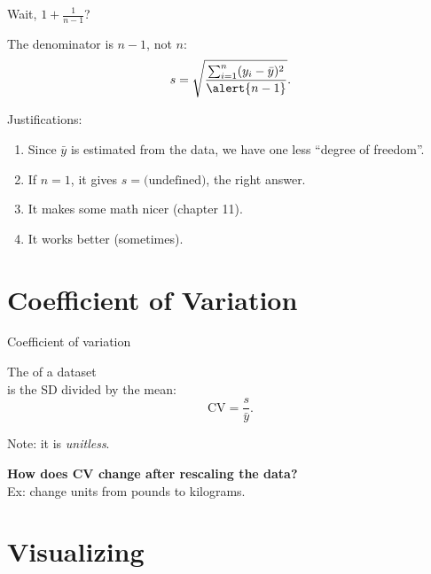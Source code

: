 \begin{frame}{Wait, $1+\frac{1}{n-1}$?}

The denominator is $n-1$, not $n$:
    \[
        s = \sqrt{\frac{\sum_{i=1}^n (y_i - \bar y)^2 }{ \alert{n-1} } } .
    \]

    \vspace{3em}

    Justifications:
    \begin{enumerate}
        \item Since $\bar y$ is estimated from the data, we have one less ``degree of freedom''.
        \item If $n=1$, it gives $s=\text{(undefined)}$, the right answer.
        \item It makes some math nicer (chapter 11).
        \item It works better (sometimes).
    \end{enumerate}

\end{frame}



\section{Coefficient of Variation}



\begin{frame}{Coefficient of variation}

    The  of a dataset\\
    is the SD divided by the mean:
    \[
        \text{CV} = \frac{ s }{ \bar y } .
    \]
    \vspace{1em}

    Note: it is \emph{unitless}.

    \vspace{3em}

    \pause
    \textbf{How does CV change after rescaling the data?} \\
    Ex: change units from pounds to kilograms.

\end{frame}


\section{Visualizing}

